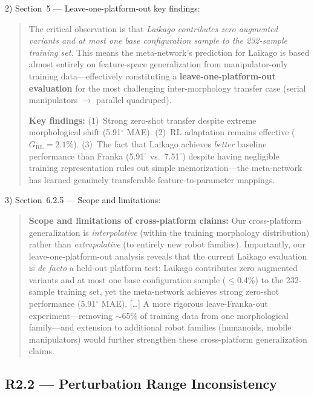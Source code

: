 \documentclass[11pt,a4paper]{article}
\begin{document}
2) Section~5 --- Leave-one-platform-out key findings:

\begin{quote}\color{blue}\small
The critical observation is that \textit{Laikago contributes zero augmented variants and at most one base configuration sample to the 232-sample training set}. This means the meta-network's prediction for Laikago is based almost entirely on feature-space generalization from manipulator-only training data---effectively constituting a \textbf{leave-one-platform-out evaluation} for the most challenging inter-morphology transfer case (serial manipulators $\rightarrow$ parallel quadruped).

\textbf{Key findings:} (1)~Strong zero-shot transfer despite extreme morphological shift (5.91$^\circ$ MAE). (2)~RL adaptation remains effective ($G_{\mathrm{RL}}=2.1\%$). (3)~The fact that Laikago achieves \textit{better} baseline performance than Franka (5.91$^\circ$ vs.\ 7.51$^\circ$) despite having negligible training representation rules out simple memorization---the meta-network has learned genuinely transferable feature-to-parameter mappings.
\end{quote}

3) Section~6.2.5 --- Scope and limitations:

\begin{quote}\color{blue}\small
\textbf{Scope and limitations of cross-platform claims:} Our cross-platform generalization is \textit{interpolative} (within the training morphology distribution) rather than \textit{extrapolative} (to entirely new robot families). Importantly, our leave-one-platform-out analysis reveals that the current Laikago evaluation is \textit{de facto} a held-out platform test: Laikago contributes zero augmented variants and at most one base configuration sample ($\leq$0.4\%) to the 232-sample training set, yet the meta-network achieves strong zero-shot performance (5.91$^\circ$ MAE). [\ldots] A more rigorous leave-Franka-out experiment---removing $\sim$65\% of training data from one morphological family---and extension to additional robot families (humanoids, mobile manipulators) would further strengthen these cross-platform generalization claims.
\end{quote}

\subsection*{R2.2 --- Perturbation Range Inconsistency}
\end{document}
